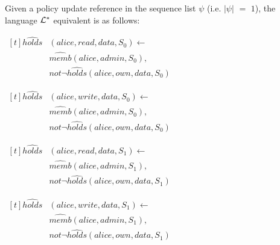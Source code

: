 \documentclass[11pt, twocolumn]{article}
\newenvironment{vquote}
  {\begin{list}{}{\leftmargin 1em}\item[]}
  {\end{list}}
\begin{document}
          Given a policy update reference in the sequence list $\psi$ (i.e.
          $|\psi|$ $=$ $1$), the language ${\cal L}^{*}$ equivalent is as
          follows:

          \begin{vquote}
            \begin{math}
              \begin{aligned}[t]
                \hat{holds}&(alice, read, data, S_{0}) \leftarrow \\
                 & \hat{memb}(alice, admin, S_{0}), \\
                 & not \lnot \hat{holds}(alice, own, data, S_{0})
              \end{aligned}
            \end{math}

            \begin{math}
              \begin{aligned}[t]
                \hat{holds}&(alice, write, data, S_{0}) \leftarrow \\
                 & \hat{memb}(alice, admin, S_{0}), \\
                 & not \lnot \hat{holds}(alice, own, data, S_{0})
              \end{aligned}
            \end{math}

            \begin{math}
              \begin{aligned}[t]
                \hat{holds}&(alice, read, data, S_{1}) \leftarrow \\
                 & \hat{memb}(alice, admin, S_{1}), \\
                 & not \lnot \hat{holds}(alice, own, data, S_{1})
              \end{aligned}
            \end{math}

            \begin{math}
              \begin{aligned}[t]
                \hat{holds}&(alice, write, data, S_{1}) \leftarrow \\
                 & \hat{memb}(alice, admin, S_{1}), \\
                 & not \lnot \hat{holds}(alice, own, data, S_{1})
              \end{aligned}
            \end{math}
          \end{vquote}
\end{document}
